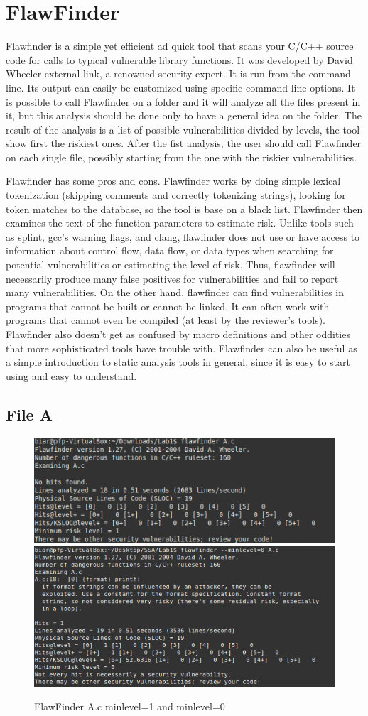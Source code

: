 \documentclass[a4paper]{article}
\begin{document}
\section*{FlawFinder}

Flawfinder is a simple yet efficient ad quick tool that scans your C/C++ source 
code for calls to typical vulnerable library functions. It was developed by 
David Wheeler external link, a renowned security expert. It is run from the 
command line. Its output can easily be customized using specific command-line options. 
It is possible to call Flawfinder on a folder and it will analyze all the files
present in it, but this analysis should be done only to have a general idea on the folder.
The result of the analysis is a list of possible vulnerabilities divided by levels, the tool
show first the riskiest ones.
After the fist analysis, the user should call Flawfinder on each single file, possibly starting 
from the one with the riskier vulnerabilities.

Flawfinder has some pros and cons. Flawfinder works by doing simple
lexical tokenization (skipping comments and correctly tokenizing strings), 
looking for token matches to the
database, so the tool is base on a black list. 
Flawfinder then examines the text of the function parameters to estimate risk.
Unlike tools such as splint, gcc’s warning flags, and clang, 
flawfinder does not use or have access to information
about control flow, data flow, or data types when searching 
for potential vulnerabilities or estimating
the level of risk. Thus, flawfinder will necessarily produce many 
false positives for vulnerabilities and fail
to report many vulnerabilities. On the other hand, 
flawfinder can find vulnerabilities in programs that cannot
be built or cannot be linked. It can often work with programs 
that cannot even be compiled (at least by
the reviewer’s tools). Flawfinder also doesn’t get as confused 
by macro definitions and other oddities that
more sophisticated tools have trouble with. Flawfinder can 
also be useful as a simple introduction to static
analysis tools in general, since it is easy to start using and easy to understand.

\subsection*{File A}
\begin{figure}[h!]
    \centering
    \includegraphics[width=0.48\linewidth]{A-f}\quad\includegraphics[width=0.48\linewidth]{min-A}
    \caption{FlawFinder A.c minlevel=1 and minlevel=0}
\end{figure}
\end{document}
